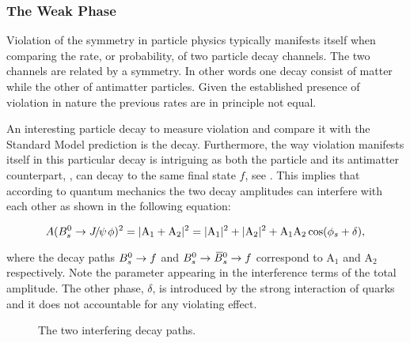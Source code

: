 

\subsubsection{The Weak Phase \phis}
Violation of the \CP symmetry in particle physics typically manifests itself when comparing
the rate, or probability, of two particle decay channels. The two channels are related by
a \CP symmetry. In other words one decay consist of matter while the other of antimatter particles.
Given the established presence of \CP violation in nature the previous rates are in principle not equal.

An interesting particle decay to measure \CP violation and compare it with the Standard Model
prediction is the \BsJpsiPhi decay.
Furthermore, the way \CP violation manifests itself in this particular decay is intriguing
as both the \Bs particle and its antimatter counterpart, \Bsb, can decay to the same final state $f$,
see . This implies that according to quantum mechanics the two decay
amplitudes can interfere with each other as shown in the following equation:

\newcommand{\aOne}{\ensuremath{ \mathrm{A_1}}\xspace}
\newcommand{\aTwo}{\ensuremath{ \mathrm{A_2}}\xspace}
\begin{equation}
  \centering
A(\BsJpsiPhi)^2 = |\aOne + \aTwo|^2 = |\aOne|^2 + |\aTwo|^2 + \aOne\aTwo\cos(\phis + \delta),
  \label{app_interf_amp}
\end{equation}

\noindent where the decay paths $B^0_s\rightarrow f$ and $B^0_s \rightarrow \kern 0.18em\overline{\kern -0.18em B}{}^0_s \rightarrow f$ correspond to \aOne and \aTwo
respectively. Note the \phis parameter appearing in the interference terms of the total amplitude.
The other phase, $\delta$, is introduced by the strong interaction of quarks and it does not
accountable for any \CP violating effect.

\begin{figure}[h]
  \centering
  \resizebox{0.4\textwidth}{!}{}
  \caption{The two interfering decay paths.}
  \label{app_interference}
\end{figure}

